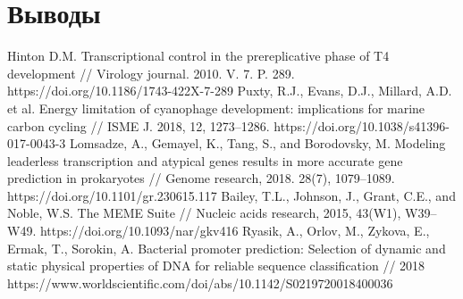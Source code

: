 \documentclass[a4paper,12pt]{article}
\begin{document}
\newpage
\section{Выводы}


\newpage
\begin{thebibliography}{9}
     Hinton D.M. Transcriptional control in the prereplicative phase of T4 development // Virology journal. 2010. V. 7. P. 289. https://doi.org/10.1186/1743-422X-7-289
     Puxty, R.J., Evans, D.J., Millard, A.D. et al. Energy limitation of cyanophage development: implications for marine carbon cycling // ISME J. 2018, 12, 1273–1286. https://doi.org/10.1038/s41396-017-0043-3
     Lomsadze, A., Gemayel, K., Tang, S., and Borodovsky, M. Modeling leaderless transcription and atypical genes results in more accurate gene prediction in prokaryotes // Genome research,  2018. 28(7), 1079–1089. https://doi.org/10.1101/gr.230615.117
     Bailey, T.L., Johnson, J., Grant, C.E., and Noble, W.S. The MEME Suite // Nucleic acids research, 2015, 43(W1), W39–W49. https://doi.org/10.1093/nar/gkv416
     Ryasik, A., Orlov, M., Zykova, E., Ermak, T., Sorokin, A. Bacterial promoter prediction: Selection of dynamic and static physical properties of DNA for reliable sequence classification // 2018 https://www.worldscientific.com/doi/abs/10.1142/S0219720018400036
    
\end{thebibliography}
\end{document}
